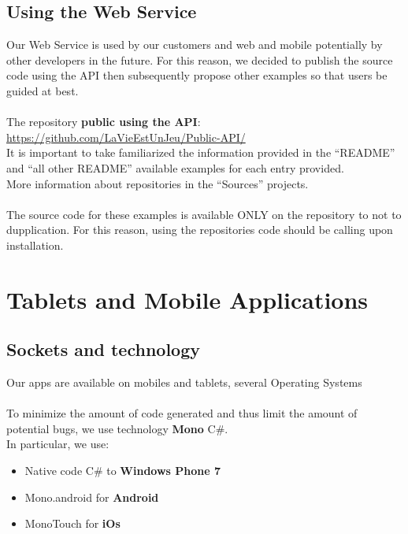 \documentclass{life-fr}
\begin{document}
\section{Using the Web Service}

Our Web Service is used by our customers and web and mobile
potentially by other developers in the future. For this reason,
we decided to publish the source code using the API
then subsequently propose other examples so that users
be guided at best.\\
\\
The repository \textbf{public using the API}:
\url{https://github.com/LaVieEstUnJeu/Public-API/} \\
It is important to take familiarized the information provided in the
``README'' and ``all other README'' available examples for each entry
provided.\\
More information about repositories in the ``Sources'' projects.\\
\\
The source code for these examples is available ONLY on the repository to
not to dupplication. For this reason, using the repositories
code should be calling upon installation.


\chapter{Tablets and Mobile Applications}

\section{Sockets and technology}

Our apps are available on mobiles and tablets, several
Operating Systems\\
\\
To minimize the amount of code generated and thus limit the
amount of potential bugs, we use technology \textbf{Mono}
C\#.\\
In particular, we use:
\begin{itemize}
  \item Native code C\# to \textbf{Windows Phone 7}
  \item Mono.android for \textbf{Android}
  \item MonoTouch for \textbf{iOs}
\end{itemize}
\end{document}
